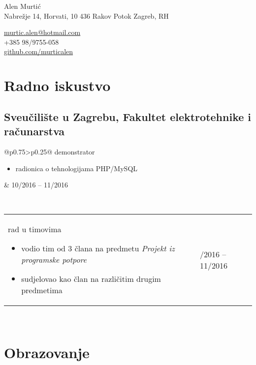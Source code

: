 \documentclass[a4paper]{article}
\makeatletter
\newlength{\tablewidth}
\newenvironment{period}[2]{%
\newcommand{\sarma}{#2}%
\setlength{\tablewidth}{\linewidth}
\addtolength{\tablewidth}{-2\tabcolsep}
\begin{tabular}{@{}p{0.75\tablewidth}>{\raggedleft\arraybackslash}p{0.25\tablewidth}@{}}%
#1 \newline
\begin{itemize}
}{%
\end{itemize} & \sarma \\%
\end{tabular}\\
}
\makeatother
\begin{document}
\fontfamily{\sfdefault}
\selectfont

\begin{minipage}{.5\textwidth}
\LARGE{Alen Murtić}\\
\normalsize{Nabrežje 14, Horvati, 10 436 Rakov Potok
	\newline
	Zagreb, RH}
\end{minipage}%
\begin{minipage}{.5\textwidth}
\raggedleft
\href{mailto:murtic.alen@hotmail.com}{murtic.alen@hotmail.com} \\
+385 98/9755-058 \\
\href{https://github.com/murticalen}{github.com/murticalen}
\end{minipage}

\vspace{1em}

\section{Radno iskustvo}

\subsection{Sveučilište u Zagrebu, Fakultet elektrotehnike i računarstva}
\begin{period}{demonstrator}{10/2016 -- 11/2016}
	\item radionica o tehnologijama PHP/MySQL
\end{period}
\begin{period}{rad u timovima}{}
	\item vodio tim od 3 člana na predmetu \textit{Projekt iz programske potpore}
	\item sudjelovao kao član na različitim drugim predmetima\end{period}

\section{Obrazovanje}
\end{document}
